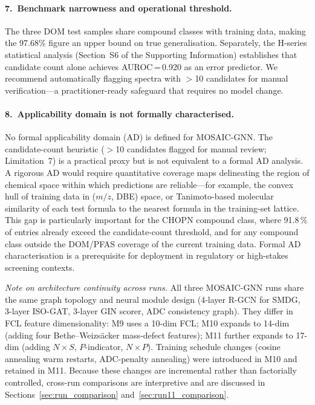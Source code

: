 \documentclass[journal=jcisd8]{achemso}
\begin{document}
\paragraph{7.\ Benchmark narrowness and operational threshold.}
The three DOM test samples share compound classes with training data, making
the 97.68\% figure an upper bound on true generalisation.
Separately, the H-series statistical analysis (Section~S6 of the Supporting Information) establishes that
candidate count alone achieves AUROC\,=\,0.920 as an error predictor.
We recommend automatically flagging spectra with $>$10 candidates for manual
verification---a practitioner-ready safeguard that requires no model change.

\paragraph{8.\ Applicability domain is not formally characterised.}
No formal applicability domain (AD) is defined for MOSAIC-GNN.
The candidate-count heuristic ($>$10 candidates flagged for manual review; Limitation~7)
is a practical proxy but is not equivalent to a formal AD analysis.
A rigorous AD would require quantitative coverage maps delineating the region of
chemical space within which predictions are reliable---for example, the convex hull of
training data in ($m/z$, DBE) space, or Tanimoto-based molecular similarity of each
test formula to the nearest formula in the training-set lattice.
This gap is particularly important for the CHOPN compound class, where 91.8\,\% of
entries already exceed the candidate-count threshold, and for any compound class
outside the DOM/PFAS coverage of the current training data.
Formal AD characterisation is a prerequisite for deployment in regulatory or
high-stakes screening contexts.

\noindent
\textit{Note on architecture continuity across runs.}
All three MOSAIC-GNN runs share the same graph topology and neural module design
(4-layer R-GCN for SMDG, 3-layer ISO-GAT, 3-layer GIN scorer, ADC consistency graph).
They differ in FCL feature dimensionality: M9 uses a 10-dim FCL;
M10 expands to 14-dim (adding four Bethe--Weizs{\"a}cker mass-defect features);
M11 further expands to 17-dim (adding $N{\times}S$, $P$-indicator, $N{\times}P$).
Training schedule changes (cosine annealing warm restarts, ADC-penalty annealing)
were introduced in M10 and retained in M11.
Because these changes are incremental rather than factorially controlled,
cross-run comparisons are interpretive and are discussed in
Sections~\ref{sec:run_comparison} and~\ref{sec:run11_comparison}.
\end{document}
